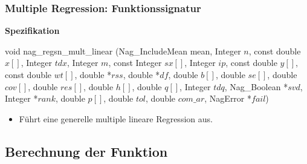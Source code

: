 \documentclass{beamer}
\begin{document}
\begin{frame}
  \frametitle{Multiple Regression: Funktionssignatur}
  
  \par \textbf{Spezifikation}\\[3mm]
  
  \par void nag\_regsn\_mult\_linear (Nag\_IncludeMean mean, Integer \alert<2>{$n$}, \linebreak
  \hspace*{5mm} const double \alert<2>{$x[]$}, Integer $tdx$, Integer \alert<2>{$m$}, const Integer \alert<2>{$sx[]$}, 
  \hspace*{5mm} Integer \alert<2>{$ip$}, const double \alert<2>{$y[]$}, const double $wt[]$, double \alert<3>{*$rss$}, \linebreak
  \hspace*{5mm} double *$df$, double \alert<3>{$b[]$}, double \alert<3>{$se[]$}, double $cov[]$, double \alert<3>{$res[]$},
  \hspace*{5mm} double $h[]$, double \alert<3>{$q[]$}, Integer $tdq$, Nag\_Boolean *$svd$, \linebreak
  \hspace*{5mm} Integer *$rank$, double $p[]$, double $tol$, double $com\_ar$, \linebreak
  \hspace*{5mm} NagError *$fail$)
    
  \begin{itemize}
  \item Führt eine generelle multiple lineare Regression aus.
  \end{itemize}

  

\end{frame}

\subsection{Berechnung der Funktion}
\end{document}
